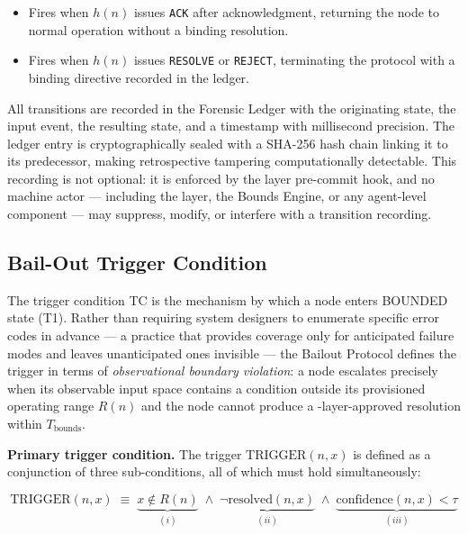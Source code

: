 \begin{itemize}
\item[T8 --- \texttt{HUMAN\_ACKNOWLEDGED $\rightarrow$ IDLE}:] Fires when $h(n)$ issues \texttt{ACK} after acknowledgment, returning the node to normal operation without a binding resolution.

\item[T9 --- \texttt{HUMAN\_ACKNOWLEDGED $\rightarrow$ RESOLVED}:] Fires when $h(n)$ issues \texttt{RESOLVE} or \texttt{REJECT}, terminating the protocol with a binding directive recorded in the ledger.
\end{itemize}

All transitions are recorded in the Forensic Ledger with the originating state, the input event, the resulting state, and a timestamp with millisecond precision. The ledger entry is cryptographically sealed with a SHA-256 hash chain linking it to its predecessor, making retrospective tampering computationally detectable. This recording is not optional: it is enforced by the \fact{} layer pre-commit hook, and no machine actor — including the \bounds{} layer, the Bounds Engine, or any agent-level component — may suppress, modify, or interfere with a transition recording.

\subsection{Bail-Out Trigger Condition}\label{sec:bailout-trigger}

The trigger condition TC is the mechanism by which a node enters BOUNDED state (T1). Rather than requiring system designers to enumerate specific error codes in advance — a practice that provides coverage only for anticipated failure modes and leaves unanticipated ones invisible — the Bailout Protocol defines the trigger in terms of \emph{observational boundary violation}: a node escalates precisely when its observable input space contains a condition outside its provisioned operating range $R(n)$ and the node cannot produce a \fact-layer-approved resolution within $T_{\text{bounds}}$.

\bigskip
\noindent\textbf{Primary trigger condition.} The trigger $\text{TRIGGER}(n, x)$ is defined as a conjunction of three sub-conditions, all of which must hold simultaneously:

\begin{equation}
\text{TRIGGER}(n, x) \;\equiv\; \underbrace{x \notin R(n)}_{(i)} \;\land\; \underbrace{\neg\text{resolved}(n, x)}_{(ii)} \;\land\; \underbrace{\text{confidence}(n, x) < \tau}_{(iii)} \tag{TC}
\end{equation}

